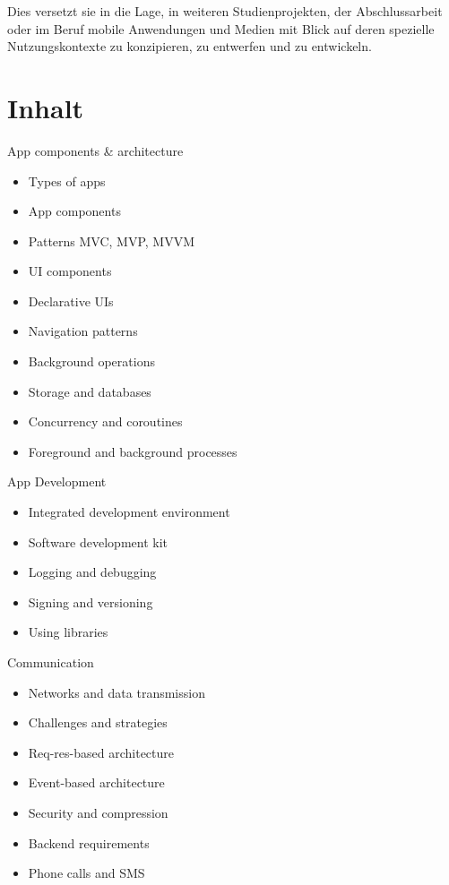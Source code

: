 Dies versetzt sie in die Lage, in weiteren Studienprojekten, der
Abschlussarbeit oder im Beruf mobile Anwendungen und Medien mit Blick
auf deren spezielle Nutzungskontexte zu konzipieren, zu entwerfen und zu
entwickeln.

\hypertarget{inhaltpathlabelmi-2017modulbeschreibungen-bachelorba_mobile-computing}{%
\section*{Inhalt\label{/mi-2017/modulbeschreibungen-bachelor/BA_Mobile-Computing}}\label{inhaltpathlabelmi-2017modulbeschreibungen-bachelorba_mobile-computing}}

App components \& architecture

\begin{itemize}
\tightlist
\item
  Types of apps
\item
  App components
\item
  Patterns MVC, MVP, MVVM
\item
  UI components
\item
  Declarative UIs
\item
  Navigation patterns
\item
  Background operations
\item
  Storage and databases
\item
  Concurrency and coroutines
\item
  Foreground and background processes
\end{itemize}

App Development

\begin{itemize}
\tightlist
\item
  Integrated development environment
\item
  Software development kit
\item
  Logging and debugging
\item
  Signing and versioning
\item
  Using libraries
\end{itemize}

Communication

\begin{itemize}
\tightlist
\item
  Networks and data transmission
\item
  Challenges and strategies
\item
  Req-res-based architecture
\item
  Event-based architecture
\item
  Security and compression
\item
  Backend requirements
\item
  Phone calls and SMS
\end{itemize}

